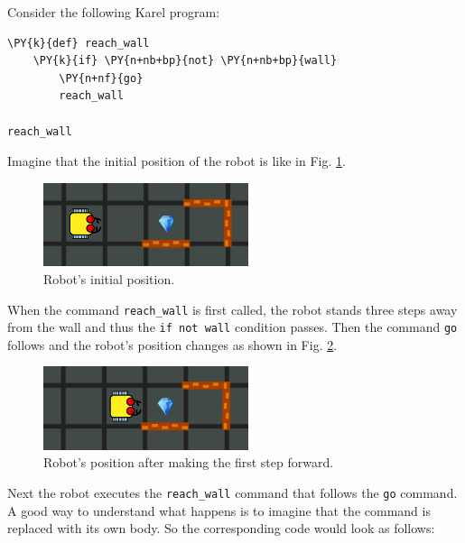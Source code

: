 Consider the following Karel program:\\

\begin{bbox}
\begin{Verbatim}[commandchars=\\\{\}]
\PY{k}{def} reach_wall
    \PY{k}{if} \PY{n+nb+bp}{not} \PY{n+nb+bp}{wall}
        \PY{n+nf}{go}
        reach_wall

reach_wall
\end{Verbatim}
\end{bbox}
\vspace{6mm}

\noindent
Imagine that the initial position of the robot is like in Fig. \ref{fig:rec1}.


\begin{figure}[!ht]
\begin{center}
\includegraphics[width=6cm]{img/rec-1.png}
\end{center}
\vspace{-4mm}
\caption{Robot's initial position.}
\label{fig:rec1}
\vspace{-4mm}
\end{figure}
\noindent
When the command {\tt reach\_wall} is first called, the robot stands three steps away from the wall and 
thus the {\tt if not wall} condition passes. Then the command {\tt go} follows and the robot's 
position changes as shown in Fig. \ref{fig:rec2}. 

\begin{figure}[!ht]
\begin{center}
\includegraphics[width=6cm]{img/rec-2.png}
\end{center}
\vspace{-4mm}
\caption{Robot's position after making the first step forward.}
\label{fig:rec2}
\vspace{-4mm}
\end{figure}
\noindent
Next the robot executes the {\tt reach\_wall} command that follows the {\tt go} command. A good way to 
understand what happens is to imagine that the command is replaced with its own body. So the corresponding 
code would look as follows:\\

